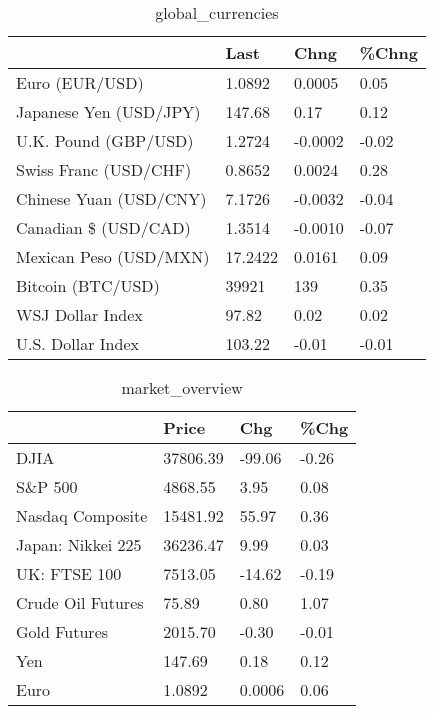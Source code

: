 \documentclass{article}%
\begin{document}
%


\begin{table}[htbp]%
\caption{global\_currencies}%
\centering%
\begin{adjustbox}{width=1\textwidth}%
\begin{tabular}{llll}
\toprule
                       &    Last &    Chng & \%Chng \\
\midrule
        Euro (EUR/USD) &  1.0892 &  0.0005 &  0.05 \\
Japanese Yen (USD/JPY) &  147.68 &    0.17 &  0.12 \\
  U.K. Pound (GBP/USD) &  1.2724 & -0.0002 & -0.02 \\
 Swiss Franc (USD/CHF) &  0.8652 &  0.0024 &  0.28 \\
Chinese Yuan (USD/CNY) &  7.1726 & -0.0032 & -0.04 \\
  Canadian \$ (USD/CAD) &  1.3514 & -0.0010 & -0.07 \\
Mexican Peso (USD/MXN) & 17.2422 &  0.0161 &  0.09 \\
     Bitcoin (BTC/USD) &   39921 &     139 &  0.35 \\
      WSJ Dollar Index &   97.82 &    0.02 &  0.02 \\
     U.S. Dollar Index &  103.22 &   -0.01 & -0.01 \\
\bottomrule
\end{tabular}
%
\end{adjustbox}%
\end{table}

%


\begin{table}[htbp]%
\caption{market\_overview}%
\centering%
\begin{adjustbox}{width=1\textwidth}%
\begin{tabular}{llll}
\toprule
                  &    Price &    Chg &  \%Chg \\
\midrule
             DJIA & 37806.39 & -99.06 & -0.26 \\
          S\&P 500 &  4868.55 &   3.95 &  0.08 \\
 Nasdaq Composite & 15481.92 &  55.97 &  0.36 \\
Japan: Nikkei 225 & 36236.47 &   9.99 &  0.03 \\
     UK: FTSE 100 &  7513.05 & -14.62 & -0.19 \\
Crude Oil Futures &    75.89 &   0.80 &  1.07 \\
     Gold Futures &  2015.70 &  -0.30 & -0.01 \\
              Yen &   147.69 &   0.18 &  0.12 \\
             Euro &   1.0892 & 0.0006 &  0.06 \\
\bottomrule
\end{tabular}
%
\end{adjustbox}%
\end{table}

%
\end{document}
